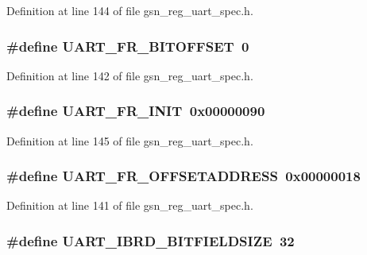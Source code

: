Definition at line 144 of file gsn\_\-reg\_\-uart\_\-spec.h.

\hypertarget{a00575_af504809da9908a397495515caa316d25}{
\subsubsection[{UART\_\-FR\_\-BITOFFSET}]{\setlength{\rightskip}{0pt plus 5cm}\#define UART\_\-FR\_\-BITOFFSET~0}}
\label{a00575_af504809da9908a397495515caa316d25}


Definition at line 142 of file gsn\_\-reg\_\-uart\_\-spec.h.

\hypertarget{a00575_ac31d3f40c35da7b202886e09c2d7c368}{
\subsubsection[{UART\_\-FR\_\-INIT}]{\setlength{\rightskip}{0pt plus 5cm}\#define UART\_\-FR\_\-INIT~0x00000090}}
\label{a00575_ac31d3f40c35da7b202886e09c2d7c368}


Definition at line 145 of file gsn\_\-reg\_\-uart\_\-spec.h.

\hypertarget{a00575_a4cd9e10816a9a02db35d0300d3774d84}{
\subsubsection[{UART\_\-FR\_\-OFFSETADDRESS}]{\setlength{\rightskip}{0pt plus 5cm}\#define UART\_\-FR\_\-OFFSETADDRESS~0x00000018}}
\label{a00575_a4cd9e10816a9a02db35d0300d3774d84}


Definition at line 141 of file gsn\_\-reg\_\-uart\_\-spec.h.

\hypertarget{a00575_ac2ef42108ba4b06a9b4e78565e95dc87}{
\subsubsection[{UART\_\-IBRD\_\-BITFIELDSIZE}]{\setlength{\rightskip}{0pt plus 5cm}\#define UART\_\-IBRD\_\-BITFIELDSIZE~32}}
\label{a00575_ac2ef42108ba4b06a9b4e78565e95dc87}


